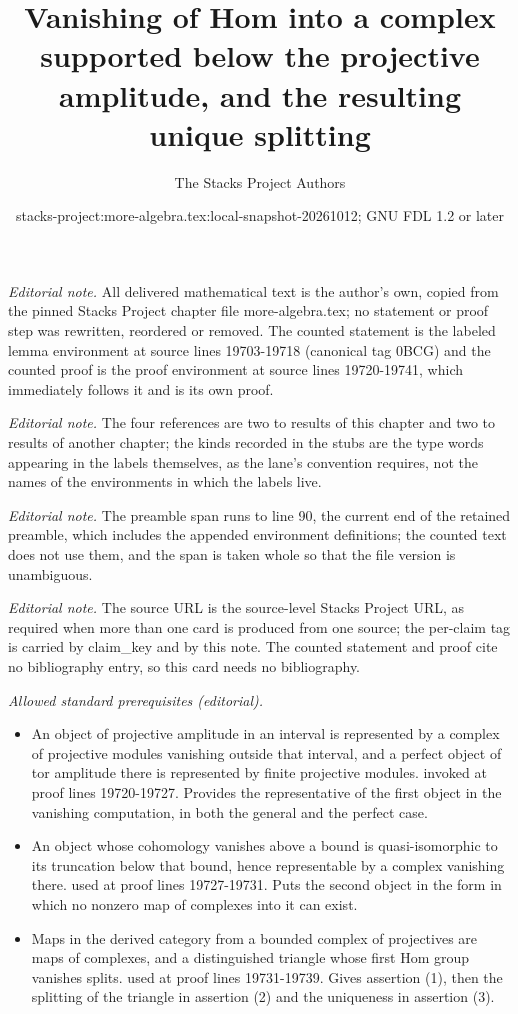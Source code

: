 \documentclass[10pt,a4paper]{amsart}
\title{Vanishing of Hom into a complex supported below the projective amplitude, and the resulting unique splitting}
\author{The Stacks Project Authors}
\date{stacks-project:more-algebra.tex:local-snapshot-20261012; GNU FDL 1.2 or later}
\theoremstyle{plain}
\theoremstyle{definition}
\theoremstyle{remark}
\numberwithin{equation}{subsection}
\begin{document}
\maketitle
\setcounter{subsection}{1}
\noindent\textit{Editorial note.} All delivered mathematical text is the author's own, copied from the pinned Stacks Project chapter file more-algebra.tex; no statement or proof step was rewritten, reordered or removed. The counted statement is the labeled lemma environment at source lines 19703-19718 (canonical tag 0BCG) and the counted proof is the proof environment at source lines 19720-19741, which immediately follows it and is its own proof.\par\medskip
\noindent\textit{Editorial note.} The four references are two to results of this chapter and two to results of another chapter; the kinds recorded in the stubs are the type words appearing in the labels themselves, as the lane's convention requires, not the names of the environments in which the labels live.\par\medskip
\noindent\textit{Editorial note.} The preamble span runs to line 90, the current end of the retained preamble, which includes the appended environment definitions; the counted text does not use them, and the span is taken whole so that the file version is unambiguous.\par\medskip
\noindent\textit{Editorial note.} The source URL is the source-level Stacks Project URL, as required when more than one card is produced from one source; the per-claim tag is carried by claim\_key and by this note. The counted statement and proof cite no bibliography entry, so this card needs no bibliography.\par\medskip
\noindent\textit{Allowed standard prerequisites (editorial).}\begin{itemize}
\item An object of projective amplitude in an interval is represented by a complex of projective modules vanishing outside that interval, and a perfect object of tor amplitude there is represented by finite projective modules. invoked at proof lines 19720-19727. Provides the representative of the first object in the vanishing computation, in both the general and the perfect case.
\item An object whose cohomology vanishes above a bound is quasi-isomorphic to its truncation below that bound, hence representable by a complex vanishing there. used at proof lines 19727-19731. Puts the second object in the form in which no nonzero map of complexes into it can exist.
\item Maps in the derived category from a bounded complex of projectives are maps of complexes, and a distinguished triangle whose first Hom group vanishes splits. used at proof lines 19731-19739. Gives assertion (1), then the splitting of the triangle in assertion (2) and the uniqueness in assertion (3).
\end{itemize}\medskip
\end{document}
